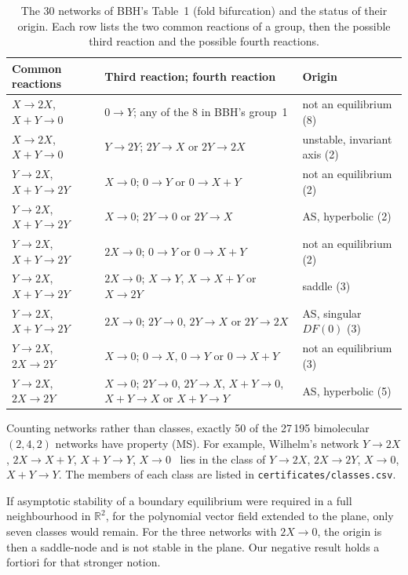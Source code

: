 \documentclass[11pt,a4paper]{report}
\providecommand{\R}{\mathbb{R}}
\begin{document}
\begin{table}[ht]
\centering
\caption{The 30 networks of BBH's Table~1 (fold bifurcation) and the status of their origin. Each row lists the
two common reactions of a group, then the possible third reaction and the possible fourth reactions.}\label{tab:thirty}
\small
\begin{tabular}{p{3.2cm}p{5.6cm}p{3.0cm}}
\hline
Common reactions & Third reaction; fourth reaction & Origin \\
\hline
\(X\to2X\), \(X+Y\to0\) & \(0\to Y\); any of the 8 in BBH's group~1 & not an equilibrium (8) \\
\(X\to2X\), \(X+Y\to0\) & \(Y\to2Y\); \(2Y\to X\) or \(2Y\to2X\) & unstable, invariant axis (2) \\
\(Y\to2X\), \(X+Y\to2Y\) & \(X\to0\); \(0\to Y\) or \(0\to X+Y\) & not an equilibrium (2) \\
\(Y\to2X\), \(X+Y\to2Y\) & \(X\to0\); \(2Y\to0\) or \(2Y\to X\) & AS, hyperbolic (2) \\
\(Y\to2X\), \(X+Y\to2Y\) & \(2X\to0\); \(0\to Y\) or \(0\to X+Y\) & not an equilibrium (2) \\
\(Y\to2X\), \(X+Y\to2Y\) & \(2X\to0\); \(X\to Y\), \(X\to X+Y\) or \(X\to2Y\) & saddle (3) \\
\(Y\to2X\), \(X+Y\to2Y\) & \(2X\to0\); \(2Y\to0\), \(2Y\to X\) or \(2Y\to2X\) & AS, singular \(DF(0)\) (3) \\
\(Y\to2X\), \(2X\to2Y\) & \(X\to0\); \(0\to X\), \(0\to Y\) or \(0\to X+Y\) & not an equilibrium (3) \\
\(Y\to2X\), \(2X\to2Y\) & \(X\to0\); \(2Y\to0\), \(2Y\to X\), \(X+Y\to0\), \(X+Y\to X\) or \(X+Y\to Y\) & AS, hyperbolic (5) \\
\hline
\end{tabular}
\end{table}

\begin{remark}\label{rem:fifty}
Counting networks rather than classes, exactly 50 of the 27\,195 bimolecular \((2,4,2)\) networks have property
(MS). For example, Wilhelm's network \(Y\to2X\), \(2X\to X+Y\), \(X+Y\to Y\), \(X\to0\)~\autocite{Wilhelm2009} lies in
the class of \(Y\to2X\), \(2X\to2Y\), \(X\to0\), \(X+Y\to Y\). The members of each class are listed in
\texttt{certificates/classes.csv}.
\end{remark}

\begin{remark}
If asymptotic stability of a boundary equilibrium were required in a full neighbourhood in \(\R^2\), for the
polynomial vector field extended to the plane, only seven classes would remain. For the three networks with \(2X\to0\),
the origin is then a saddle-node and is not stable in the plane. Our negative result holds a fortiori for that
stronger notion.
\end{remark}
\end{document}
